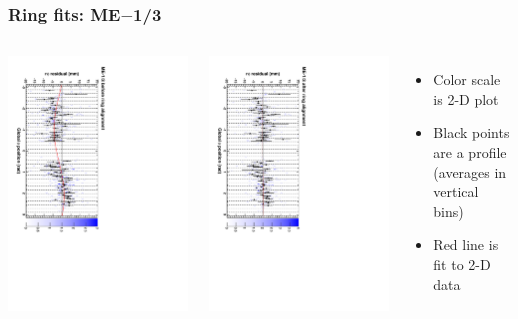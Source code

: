 \documentclass[compress]{beamer}
\begin{document}
\begin{frame}
\frametitle{Ring fits: ME$-$1/3}
\vfill
\begin{columns}
\includegraphics[height=\linewidth, angle=90]{ringfits_before/mem13.pdf}

\includegraphics[height=\linewidth, angle=90]{ringfits_after/mem13.pdf}
\begin{itemize}
\item Color scale is 2-D plot
\item Black points are a profile (averages in vertical bins)
\item Red line is fit to 2-D data
\end{itemize}
\end{columns}
\end{frame}
\end{document}
